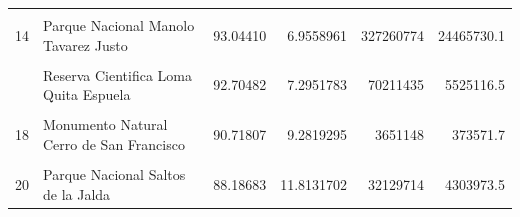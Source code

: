 \documentclass[10pt,landscape,a3paper]{article}
\begin{document}
\begin{table}[H]
\begin{tabular}[t]{llrrrr}
\cellcolor{lightgray}{13} & \cellcolor{lightgray}{Reserva Forestal Loma Novillero} & \cellcolor{lightgray}{93.31888} & \cellcolor{lightgray}{6.6811206} & \cellcolor{lightgray}{12028318} & \cellcolor{lightgray}{861161.7}\\
14 & Parque Nacional Manolo Tavarez Justo & 93.04410 & 6.9558961 & 327260774 & 24465730.1\\
\cellcolor{lightgray}{15} & \cellcolor{lightgray}{Monumento Natural Diego de Ocampo} & \cellcolor{lightgray}{92.85590} & \cellcolor{lightgray}{7.1441013} & \cellcolor{lightgray}{23532983} & \cellcolor{lightgray}{1810569.0}\\
\addlinespace
16 & Reserva Cientifica Loma Quita Espuela & 92.70482 & 7.2951783 & 70211435 & 5525116.5\\
\cellcolor{lightgray}{17} & \cellcolor{lightgray}{Parque Nacional Picky Lora} & \cellcolor{lightgray}{92.31943} & \cellcolor{lightgray}{7.6805670} & \cellcolor{lightgray}{103652897} & \cellcolor{lightgray}{8623460.9}\\
18 & Monumento Natural Cerro de San Francisco & 90.71807 & 9.2819295 & 3651148 & 373571.7\\
\cellcolor{lightgray}{19} & \cellcolor{lightgray}{Reserva Forestal Alto Mao} & \cellcolor{lightgray}{89.03664} & \cellcolor{lightgray}{10.9633598} & \cellcolor{lightgray}{187078973} & \cellcolor{lightgray}{23035618.6}\\
20 & Parque Nacional Saltos de la Jalda & 88.18683 & 11.8131702 & 32129714 & 4303973.5\\
\bottomrule
\end{tabular}
\end{table}
\end{document}
